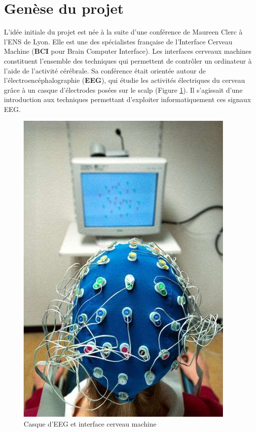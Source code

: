 \documentclass[11pt,a4paper]{article}
\theoremstyle{plain}
\theoremstyle{definition}
\begin{document}
\section{Genèse du projet}

L'idée initiale du projet est née à la suite d'une conférence de Maureen Clerc à l'ENS de Lyon. Elle est une des spécialistes française de l'Interface Cerveau Machine (\textbf{BCI} pour Brain Computer Interface).
Les interfaces cerveaux machines constituent l'ensemble des techniques qui permettent de contrôler un ordinateur à l'aide de l'activité cérébrale. Sa conférence était orientée autour de l'électroencéphalographie (\textbf{EEG}), qui étudie les activités électriques du cerveau grâce à un casque d'électrodes posées sur le scalp (Figure \ref{eeg}). Il s'agissait d'une introduction aux techniques permettant d'exploiter informatiquement ces signaux EEG.

\begin{figure}[ht]
\centering
\includegraphics[scale=0.3]{a66dbabd79_26497_8712-electroencephalogramme-dr.jpg}
\caption{Casque d'EEG et interface cerveau machine}
\label{eeg}
\end{figure}
\end{document}
